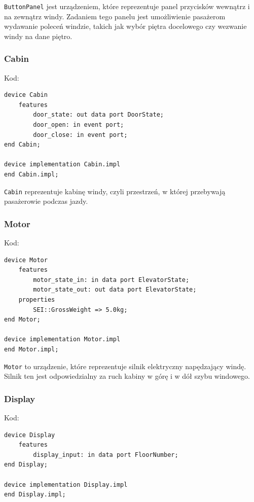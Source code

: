 \documentclass{article}
\begin{document}
    \texttt{ButtonPanel} jest urządzeniem, które reprezentuje panel przycisków wewnątrz i na zewnątrz windy. Zadaniem tego panelu jest umożliwienie pasażerom wydawanie poleceń windzie, takich jak wybór piętra docelowego czy wezwanie windy na dane piętro.


    \newpage

    \subsubsection{Cabin}

    Kod:
    
    \begin{lstlisting}[basicstyle=\ttfamily, keywordstyle=\bfseries]
device Cabin
    features
        door_state: out data port DoorState;
        door_open: in event port;
        door_close: in event port;
end Cabin;

device implementation Cabin.impl
end Cabin.impl;
    \end{lstlisting}

    \texttt{Cabin} reprezentuje kabinę windy, czyli przestrzeń, w której przebywają pasażerowie podczas jazdy. 




    \subsubsection{Motor}

    Kod:
    
    \begin{lstlisting}[basicstyle=\ttfamily, keywordstyle=\bfseries]
device Motor
    features
        motor_state_in: in data port ElevatorState;
        motor_state_out: out data port ElevatorState;
    properties
        SEI::GrossWeight => 5.0kg;
end Motor;

device implementation Motor.impl
end Motor.impl;
    \end{lstlisting}

    \texttt{Motor} to urządzenie, które reprezentuje silnik elektryczny napędzający windę. Silnik ten jest odpowiedzialny za ruch kabiny w górę i w dół szybu windowego.



    \subsubsection{Display}

    Kod:
    
    \begin{lstlisting}[basicstyle=\ttfamily, keywordstyle=\bfseries]
device Display
    features
        display_input: in data port FloorNumber; 
end Display;

device implementation Display.impl
end Display.impl;
    \end{lstlisting}
\end{document}
